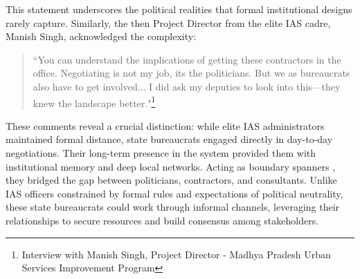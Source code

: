 This statement underscores the political realities that formal institutional designs rarely capture. Similarly, the then Project Director from the elite IAS 
 cadre, Manish Singh, acknowledged the complexity:

\begin{quote}
``You can understand the implications of getting these contractors in the office. Negotiating is not my job, its the politicians. But  we as bureaucrats also have to get involved... I did ask my deputies to look into this—they knew the landscape better."\footnote{Interview with Manish Singh, Project Director - Madhya Pradesh Urban Services Improvement Program}
\end{quote}

These comments reveal a crucial distinction: while elite IAS administrators maintained formal distance, state bureaucrats engaged directly in day-to-day negotiations. Their long-term presence in the system provided them with institutional memory and deep local networks. Acting as boundary spanners \citep{tushman_boundary_1981}, they bridged the gap between politicians, contractors, and consultants. Unlike IAS officers constrained by formal rules and expectations of political neutrality, these state bureaucrats could work through informal channels, leveraging their relationships to secure resources and build consensus among stakeholders.



